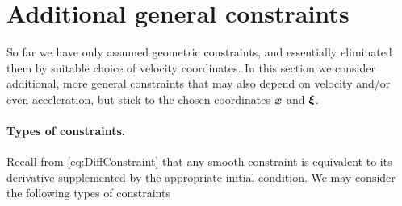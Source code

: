 \section{Additional general constraints}
So far we have only assumed geometric constraints, and essentially eliminated them by suitable choice of velocity coordinates.
In this section we consider additional, more general constraints that may also depend on velocity and/or even acceleration, but stick to the chosen coordinates $\boldsymbol{x}$ and $\boldsymbol{\xi}$.

\paragraph{Types of constraints.}
Recall from \eqref{eq:DiffConstraint} that any smooth constraint is equivalent to its derivative supplemented by the appropriate initial condition.
We may consider the following types of constraints
